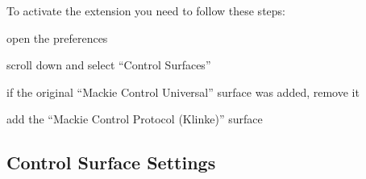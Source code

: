\noindent
To activate the extension you need to follow these steps:
\begin{compactitem}
\item open the \reaper preferences
\item scroll down and select ``Control Surfaces'' 
\item if the original ``Mackie Control Universal'' surface was added, remove it
\item add the ``Mackie Control Protocol (Klinke)'' surface

\end{compactitem}


 

\subsection{Control Surface Settings}\label{settings}

